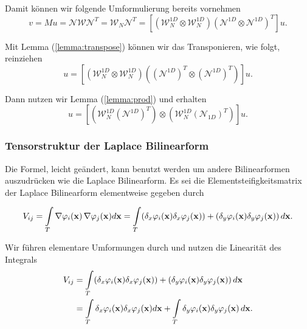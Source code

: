 Damit können wir folgende Umformulierung bereits vornehmen
\begin{equation}
v=Mu= \mathcal{N} \mathcal{W} \mathcal{N}^T= \mathcal{W}_N \mathcal{N}^T =  [(\mathcal{W}_N^{1D} \otimes \mathcal{W}_N^{1D})  (\mathcal{N}^{1D} \otimes \mathcal{N}^{1D})^T]u.
\end{equation}

Mit Lemma (\ref{lemma:transpose}) können wir das Transponieren, wie folgt, reinziehen
\begin{equation}
[(\mathcal{W}_N^{1D} \otimes \mathcal{W}_N^{1D})  (\mathcal{N}^{1D} \otimes \mathcal{N}^{1D})^T]u=
[(\mathcal{W}_N^{1D} \otimes \mathcal{W}_N^{1D})  ((\mathcal{N}^{1D})^T \otimes (\mathcal{N}^{1D})^T)]u.
\end{equation}

Dann nutzen wir Lemma (\ref{lemma:prod}) und erhalten
\begin{equation}
 [(\mathcal{W}_N^{1D} \otimes \mathcal{W}_N^{1D})  ((\mathcal{N}^{1D})^T \otimes (\mathcal{N}_{1D})^T)]u= [(\mathcal{W}_N^{1D} (\mathcal{N}^{1D})^T) \otimes (\mathcal{W}_N^{1D} (\mathcal{N}_{1D})^T)]u.
\end{equation}

\newpage
\subsubsection{Tensorstruktur der Laplace Bilinearform}
Die Formel, leicht geändert, kann benutzt werden um andere Bilinearformen auszudrücken wie die Laplace Bilinearform.  Es sei die Elementsteifigkeitsmatrix der Laplace Bilinearform elementweise gegeben durch

\begin{equation}
V_{ij} = \int\limits_{T} \nabla \varphi_i(\bold{x}) \, \nabla \varphi_j(\bold{x})  d \bold{x}=\int\limits_{T}( \delta_x  \varphi_i(\bold{x})  \delta_x \varphi_j(\bold{x})) + ( \delta_y \varphi_i(\bold{x})  \delta_y \varphi_j(\bold{x})) \, d\bold{x}.
\end{equation}

Wir führen elementare Umformungen durch und nutzen die Linearität des Integrals
\begin{equation}
\begin{aligned}
V_{ij} &= \int\limits_{T}( \delta_x  \varphi_i(\bold{x})  \delta_x \varphi_j(\bold{x})) + ( \delta_y \varphi_i(\bold{x})  \delta_y \varphi_j(\bold{x})) \, d\bold{x} \\ &= \int\limits_{T} \delta_x  \varphi_i(\bold{x})  \delta_x \varphi_j(\bold{x}) d\bold{x} + \int\limits_{T}  \delta_y \varphi_i(\bold{x})  \delta_y \varphi_j(\bold{x}) \, d\bold{x}.
\end{aligned}
\end{equation}

